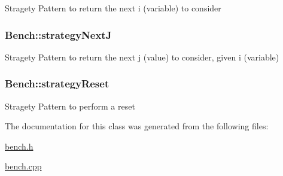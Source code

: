 \-Stragety \-Pattern to return the next i (variable) to consider \hypertarget{classBench_a4a1797a7ffaa0ce346274ac63f2379b3}{
\subsubsection[{strategy\-Next\-J}]{ {\bf \-Bench\-::strategy\-Next\-J}}}\label{classBench_a4a1797a7ffaa0ce346274ac63f2379b3}
\-Stragety \-Pattern to return the next j (value) to consider, given i (variable) \hypertarget{classBench_a88dbf079cc6c2392132efc8038b88443}{
\subsubsection[{strategy\-Reset}]{ {\bf \-Bench\-::strategy\-Reset}}}\label{classBench_a88dbf079cc6c2392132efc8038b88443}
\-Stragety \-Pattern to perform a reset 

\-The documentation for this class was generated from the following files\-:\begin{DoxyCompactItemize}
\item 
\hyperlink{bench_8h}{bench.\-h}\item 
\hyperlink{bench_8cpp}{bench.\-cpp}\end{DoxyCompactItemize}
